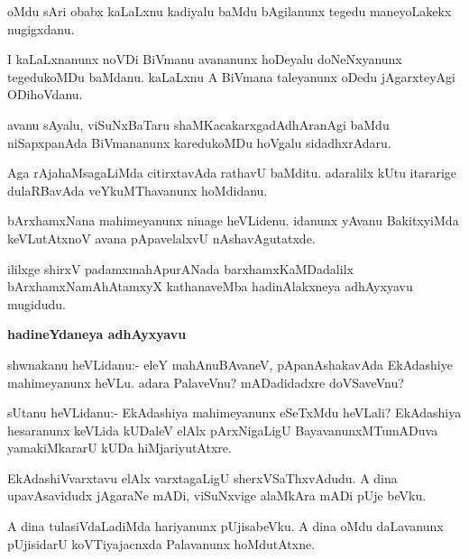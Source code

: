 \begin{mng}
oMdu sAri obabx kaLaLxnu kadiyalu baMdu bAgilanunx tegedu maneyoLakekx nugigxdanu.
\end{mng}

\begin{mng}
I kaLaLxnanunx noVDi BiVmanu avananunx hoDeyalu doNeNxyanunx tegedukoMDu baMdanu. kaLaLxnu A BiVmana taleyanunx oDedu jAgarxteyAgi ODihoVdanu.
\end{mng}

\begin{mng}
avanu sAyalu, viSuNxBaTaru shaMKacakarxgadAdhAranAgi baMdu niSapxpanAda BiVmananunx karedukoMDu hoVgalu sidadhxrAdaru.
\end{mng}

\begin{mng}
Aga rAja{ha}MsagaLiMda citirxtavAda rathavU baMditu. adaralilx kUtu itararige dulaRBavAda veYkuMThavanunx hoMdidanu.
\end{mng}

\begin{mng}
bArxhamxNana mahimeyanunx ninage heVLidenu. idanunx yAvanu BakitxyiMda keVLutAtxnoV avana pApavelalxvU nAshavAgutatxde.
\end{mng}
ililxge shirxV padamxmahApurANada barxhamxKaMDadalilx bArxhamxNamAhAtamxyX kathanaveMba hadinAlakxneya adhAyxyavu mugidudu.

\begin{center}
\textbf{\large hadineYdaneya adhAyxyavu}
\end{center}

\begin{mng}
shwnakanu heVLidanu:- eleY mahAnuBAvaneV, pApanAshakavAda EkAdashiye mahimeyanunx heVLu. adara PalaveVnu? mADadidadxre doVSaveVnu?
\end{mng}

\begin{mng}
sUtanu heVLidanu:- EkAdashiya mahimeyanunx eSeTxMdu heVLali? EkAdashiya hesaranunx keVLida kUDaleV elAlx pArxNigaLigU BayavanunxMTumADuva yamakiMkararU kUDa hiMjariyutAtxre.
\end{mng}

\begin{mng}
EkAdashiVvarxtavu elAlx varxtagaLigU sherxVSaThxvAdudu. A dina upavAsavidudx jAgaraNe mADi, viSuNxvige alaMkAra mADi pUje beVku.
\end{mng}

\begin{mng}
A dina tulasiVdaLadiMda hariyanunx pUjisabeVku. A dina oMdu daLavanunx pUjisidarU koVTiyajacnxda Palavanunx hoMdutAtxne.
\end{mng}

